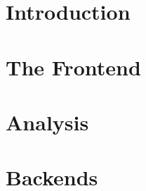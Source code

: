 \documentclass[letter]{book}
\begin{document}
{

\tableofcontents
\listoffigures






\part{Introduction}
\label{part-introduction}

	

	

	


\part{The Frontend}
\label{part-frontend}






\part{Analysis}
\label{part-analysis}






\part{Backends}
\label{part-backends}





}
\end{document}
